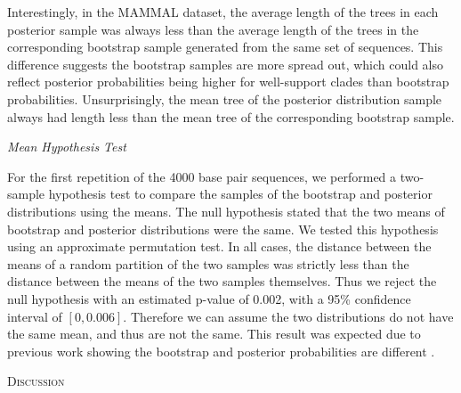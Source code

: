 \documentclass[12pt,letterpaper]{article}
\theoremstyle{plain}
\theoremstyle{definition}
\renewcommand{\section}[1]{%
\bigskip
\begin{center}
\begin{Large}
\normalfont\scshape #1
\medskip
\end{Large}
\end{center}}
\renewcommand{\subsection}[1]{%
\bigskip
\begin{center}
\begin{large}
\normalfont\itshape #1
\end{large}
\end{center}}
\begin{document}
Interestingly, in the MAMMAL dataset, the average length of the trees in each posterior sample was always less than the average length of the trees in the corresponding bootstrap sample generated from the same set of sequences. This difference suggests the bootstrap samples are more spread out, which could also reflect posterior probabilities being higher for well-support clades than bootstrap probabilities.  Unsurprisingly, the mean tree of the posterior distribution sample always had length less than the mean tree of the corresponding bootstrap sample. 

\subsection{Mean Hypothesis Test}

For the first repetition of the 4000 base pair sequences, we performed a two-sample hypothesis test to compare the samples of the bootstrap and posterior distributions using the means.  The null hypothesis stated that the two means of bootstrap and posterior distributions were the same.  We tested this hypothesis using an approximate permutation test.  In all cases, the distance between the means of a random partition of the two samples was strictly less than the distance between the means of the two samples themselves.  Thus we reject the null hypothesis with an estimated p-value of 0.002, with a 95\% confidence interval of $[0,0.006]$.  Therefore we can assume the two distributions do not have the same mean, and thus are not the same.  This result was expected due to previous work showing the bootstrap and posterior probabilities are different \citep{erixon2003reliability,douady2003comparison,huelsenbeck2004frequentist}.



\bigskip
\section{Discussion}
\label{s:discussion}

\end{document}
